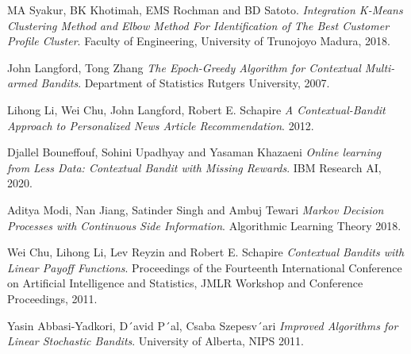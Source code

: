 \documentclass{article}
\begin{document}
\begin{thebibliography}{9}
MA Syakur, BK Khotimah, EMS Rochman and BD Satoto.
\textit{Integration K-Means Clustering Method and Elbow Method For Identification of The Best Customer Profile Cluster}. 
Faculty of Engineering, University of Trunojoyo Madura, 2018.

John Langford, Tong Zhang
\textit{The Epoch-Greedy Algorithm for Contextual
Multi-armed Bandits}. 
Department of Statistics
Rutgers University, 2007.

Lihong Li, Wei Chu, John Langford, Robert E. Schapire
\textit{A Contextual-Bandit Approach to
Personalized News Article Recommendation}. 
2012.

Djallel Bouneffouf, Sohini Upadhyay and Yasaman Khazaeni
\textit{Online learning from Less Data: Contextual Bandit with Missing Rewards}.
IBM Research AI, 2020.

Aditya Modi, Nan Jiang, 
Satinder Singh and Ambuj Tewari
\textit{Markov Decision Processes with Continuous Side Information}.
Algorithmic Learning Theory 2018.

Wei Chu, Lihong Li, 
Lev Reyzin and Robert E. Schapire
\textit{Contextual Bandits with Linear Payoff Functions}.
Proceedings of the Fourteenth International Conference on Artificial Intelligence and Statistics, JMLR Workshop and Conference Proceedings, 2011.

Yasin Abbasi-Yadkori, D´avid P´al, Csaba Szepesv´ari
\textit{Improved Algorithms for Linear Stochastic Bandits}.
University of Alberta, NIPS 2011.

\end{thebibliography}
\end{document}
